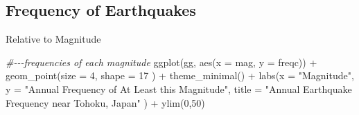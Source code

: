 \documentclass[
]{article}
\newenvironment{Shaded}{\begin{snugshade}}{\end{snugshade}}
\newcommand{\AttributeTok}[1]{\textcolor[rgb]{0.77,0.63,0.00}{#1}}
\newcommand{\CommentTok}[1]{\textcolor[rgb]{0.56,0.35,0.01}{\textit{#1}}}
\newcommand{\ControlFlowTok}[1]{\textcolor[rgb]{0.13,0.29,0.53}{\textbf{#1}}}
\newcommand{\DecValTok}[1]{\textcolor[rgb]{0.00,0.00,0.81}{#1}}
\newcommand{\FunctionTok}[1]{\textcolor[rgb]{0.00,0.00,0.00}{#1}}
\newcommand{\NormalTok}[1]{#1}
\newcommand{\OtherTok}[1]{\textcolor[rgb]{0.56,0.35,0.01}{#1}}
\newcommand{\SpecialCharTok}[1]{\textcolor[rgb]{0.00,0.00,0.00}{#1}}
\newcommand{\StringTok}[1]{\textcolor[rgb]{0.31,0.60,0.02}{#1}}
\begin{document}
\begin{Shaded}
\end{Shaded}

\hypertarget{frequency-of-earthquakes}{%
\subsection{Frequency of Earthquakes}\label{frequency-of-earthquakes}}

Relative to Magnitude

\begin{Shaded}
\begin{Highlighting}[]
\CommentTok{\#{-}{-}{-}frequencies of each magnitude}
\FunctionTok{ggplot}\NormalTok{(gg, }\FunctionTok{aes}\NormalTok{(}\AttributeTok{x =}\NormalTok{ mag, }\AttributeTok{y =}\NormalTok{ freqc)) }\SpecialCharTok{+}
  \FunctionTok{geom\_point}\NormalTok{(}\AttributeTok{size =} \DecValTok{4}\NormalTok{, }\AttributeTok{shape =} \DecValTok{17}\NormalTok{ ) }\SpecialCharTok{+}
    \FunctionTok{theme\_minimal}\NormalTok{() }\SpecialCharTok{+}
    \FunctionTok{labs}\NormalTok{(}\AttributeTok{x =} \StringTok{"Magnitude"}\NormalTok{,}
       \AttributeTok{y =} \StringTok{"Annual Frequency of At Least this Magnitude"}\NormalTok{,}
       \AttributeTok{title =} \StringTok{"Annual Earthquake Frequency near Tohoku, Japan"}\NormalTok{ ) }\SpecialCharTok{+}
  \FunctionTok{ylim}\NormalTok{(}\DecValTok{0}\NormalTok{,}\DecValTok{50}\NormalTok{)}
\end{Highlighting}
\end{Shaded}
\end{document}
